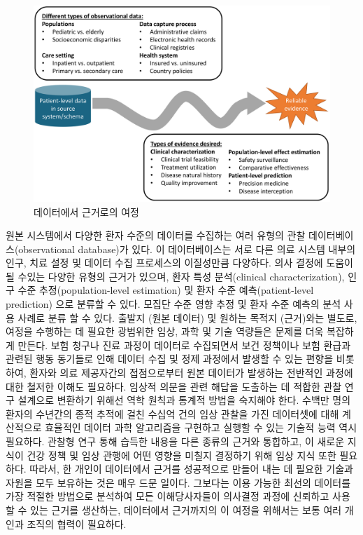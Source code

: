\documentclass[11pt]{book}
\theoremstyle{definition}
\theoremstyle{definition}
\theoremstyle{definition}
\theoremstyle{remark}
\begin{document}
\begin{figure}

{\centering \includegraphics[width=1\linewidth]{images/OhdsiCommunity/datajourney} 

}

\caption{데이터에서 근거로의 여정}\label{fig:datajourney}
\end{figure}

원본 시스템에서 다양한 환자 수준의 데이터를 수집하는 여러 유형의 관찰
데이터베이스(observational database)가 있다. 이 데이터베이스는 서로 다른
의료 시스템 내부의 인구, 치료 설정 및 데이터 수집 프로세스의 이질성만큼
다양하다. 의사 결정에 도움이 될 수있는 다양한 유형의 근거가 있으며, 환자
특성 분석(clinical characterization), 인구 수준 추정(population-level
estimation) 및 환자 수준 예측(patient-level prediction) 으로 분류할 수
있다. 모집단 수준 영향 추정 및 환자 수준 예측의 분석 사용 사례로 분류 할
수 있다. 출발지 (원본 데이터) 및 원하는 목적지 (근거)와는 별도로, 여정을
수행하는 데 필요한 광범위한 임상, 과학 및 기술 역량들은 문제를 더욱
복잡하게 만든다. 보험 청구나 진료 과정이 데이터로 수집되면서 보건
정책이나 보험 환급과 관련된 행동 동기들로 인해 데이터 수집 및 정제
과정에서 발생할 수 있는 편향을 비롯하여, 환자와 의료 제공자간의
접점으로부터 원본 데이터가 발생하는 전반적인 과정에 대한 철저한 이해도
필요하다. 임상적 의문을 관련 해답을 도출하는 데 적합한 관찰 연구
설계으로 변환하기 위해선 역학 원칙과 통계적 방법을 숙지해야 한다. 수백만
명의 환자의 수년간의 종적 추적에 걸친 수십억 건의 임상 관찰을 가진
데이터셋에 대해 계산적으로 효율적인 데이터 과학 알고리즘을 구현하고
실행할 수 있는 기술적 능력 역시 필요하다. 관찰형 연구 통해 습득한 내용을
다른 종류의 근거와 통합하고, 이 새로운 지식이 건강 정책 및 임상 관행에
어떤 영향을 미칠지 결정하기 위해 임상 지식 또한 필요하다. 따라서, 한
개인이 데이터에서 근거를 성공적으로 만들어 내는 데 필요한 기술과 자원을
모두 보유하는 것은 매우 드문 일이다. 그보다는 이용 가능한 최선의
데이터를 가장 적절한 방법으로 분석하여 모든 이해당사자들이 의사결정
과정에 신뢰하고 사용할 수 있는 근거를 생산하는, 데이터에서 근거까지의 이
여정을 위해서는 보통 여러 개인과 조직의 협력이 필요하다.
\end{document}
